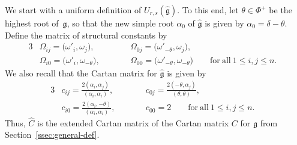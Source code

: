 \documentclass[pdftex]{sigma}
\numberwithin{equation}{section}
\newcommand{\fg}{\mathfrak{g}}
\newcommand{\wfg}{\widehat{\mathfrak{g}}}
\newcommand{\UU}{U_{r,s}(\widehat{\fg})}
\begin{document}
We start with a uniform definition of $\UU$. To this end, let $\theta\in \Phi^+$ be the highest root of~$\fg$, so that the new simple root $\alpha_0$ of $\wfg$ is given by $\alpha_0=\delta-\theta$. Define the matrix of structural constants  by
\begin{alignat*}{3}
 &\Omega_{ij}=\bigl(\omega'_i,\omega_j\bigr), \qquad&& \Omega_{0j}=\bigl(\omega'_{-\theta},\omega_j\bigr), & \\
 &\Omega_{i0}=\bigl(\omega'_i, \omega_{-\theta}\bigr), \qquad&& \Omega_{00}=\bigl(\omega'_{-\theta},\omega_{-\theta}\bigr)
 \qquad \mathrm{for\ all} \ 1\leq i,j\leq n.&
\end{alignat*}
We also recall that the Cartan matrix  for $\wfg$ is given by
\begin{alignat*}{3}
 &c_{ij}=\frac{2(\alpha_{i},\alpha_{j})}{(\alpha_{i},\alpha_{i})}, \qquad&&
 c_{0j} = \frac{2(-\theta,\alpha_{j})}{(\theta,\theta)}, &\\
 &c_{i0} = \frac{2(\alpha_{i},-\theta)}{(\alpha_{i},\alpha_{i})}, \qquad&&
 c_{00}=2 \qquad \mathrm{for\ all} \ 1\leq i,j\leq n.&
\end{alignat*}
Thus, $\hat{C}$ is the extended Cartan matrix of the Cartan matrix $C$ for $\fg$ from Section~\ref{ssec:general-def}.
\end{document}
